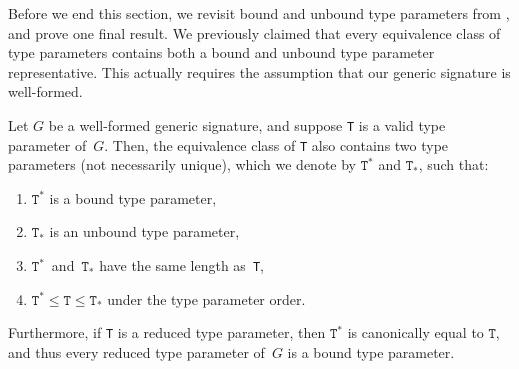 \documentclass[../generics]{subfiles}
\begin{document}
Before we end this section, we revisit bound and unbound type parameters from , and prove one final result. We previously claimed that every equivalence class of type parameters contains both a bound and unbound type parameter representative. This actually requires the assumption that our generic signature is well-formed.
\begin{theorem}\label{bound and unbound equiv}
Let $G$ be a well-formed generic signature, and suppose \texttt{T} is a valid type parameter of~$G$. Then, the equivalence class of \texttt{T} also contains two type parameters (not necessarily unique), which we denote by $\texttt{T}^*$ and $\texttt{T}_*$, such that:
\begin{enumerate}
\item $\texttt{T}^*$ is a bound type parameter,
\item $\texttt{T}_*$ is an unbound type parameter,
\item $\texttt{T}^*$~and~$\texttt{T}_*$ have the same length as~\texttt{T},
\item $\texttt{T}^*\le\texttt{T}\le\texttt{T}_*$ under the type parameter order.
\end{enumerate}
Furthermore, if \texttt{T} is a reduced type parameter, then $\texttt{T}^*$ is canonically equal to $\texttt{T}$, and thus every reduced type parameter of~$G$ is a bound type parameter.
\end{theorem}
\end{document}
